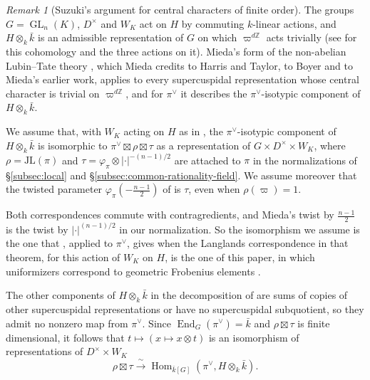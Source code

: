 \documentclass[a4paper,11pt]{amsart}
\theoremstyle{definition}
\theoremstyle{remark}
\newtheorem{remark}[theorem]{Remark}
\numberwithin{equation}{section}
\newcommand{\Z}{\mathbb{Z}}
\DeclareMathOperator{\End}{End}
\DeclareMathOperator{\GL}{GL}
\DeclareMathOperator{\Hom}{Hom}
\newcommand{\JL}{\mathrm{JL}}
\begin{document}
\begin{remark}[Suzuki's argument for central characters of finite order]
The groups $G=\GL_n(K)$, $D^\times$ and $W_K$ act on $H$ by commuting $k$-linear actions, and $H\otimes_k\bar k$ is an admissible representation of $G$ on which $\varpi^{d\Z}$ acts trivially (see \cite[\S3.1]{Mie16} for this cohomology and the three actions on it). Mieda's form of the non-abelian Lubin--Tate theory \cite[Theorem~3.1]{Mie16}, which Mieda credits to Harris and Taylor, to Boyer and to Mieda's earlier work, applies to every supercuspidal representation whose central character is trivial on $\varpi^{d\Z}$, and for $\pi^\vee$ it describes the $\pi^\vee$-isotypic component of $H\otimes_k\bar k$.

We assume that, with $W_K$ acting on $H$ as in \cite[\S3.1]{Mie16}, the $\pi^\vee$-isotypic component of $H\otimes_k\bar k$ is isomorphic to $\pi^\vee\boxtimes\rho\boxtimes\tau$ as a representation of $G\times D^\times\times W_K$, where $\rho=\JL(\pi)$ and $\tau=\varphi_\pi\otimes|\cdot|^{-(n-1)/2}$ are attached to $\pi$ in the normalizations of \S\ref{subsec:local} and \S\ref{subsec:common-rationality-field}. We assume moreover that the twisted parameter $\varphi_\pi(-\frac{n-1}2)$ of \cite[Theorem~4.0.5 and Proposition~4.0.13]{Su23} is $\tau$, even when $\rho(\varpi)=1$.

Both correspondences commute with contragredients, and Mieda's twist by $\frac{n-1}2$ is the twist by $|\cdot|^{(n-1)/2}$ in our normalization. So the isomorphism we assume is the one that \cite[Theorem~3.1]{Mie16}, applied to $\pi^\vee$, gives when the Langlands correspondence in that theorem, for this action of $W_K$ on $H$, is the one of this paper, in which uniformizers correspond to geometric Frobenius elements \cite[\S2.2.1]{Dat07}.

The other components of $H\otimes_k\bar k$ in the decomposition of \cite[\S3.1]{Mie16} are sums of copies of other supercuspidal representations or have no supercuspidal subquotient, so they admit no nonzero map from $\pi^\vee$. Since $\End_G(\pi^\vee)=\bar k$ and $\rho\boxtimes\tau$ is finite dimensional, it follows that $t\mapsto(x\mapsto x\otimes t)$ is an isomorphism of representations of $D^\times\times W_K$
\[
 \rho\boxtimes\tau\xrightarrow{\ \sim\ } \Hom_{\bar k[G]}(\pi^\vee,H\otimes_k\bar k).
\]


\end{remark}
\end{document}
